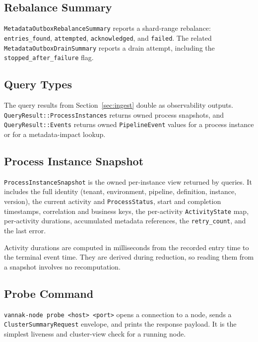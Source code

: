 \subsection{Rebalance Summary}

\texttt{MetadataOutboxRebalanceSummary} reports a shard-range rebalance:
\texttt{entries\_found}, \texttt{attempted}, \texttt{acknowledged}, and
\texttt{failed}. The related \texttt{MetadataOutboxDrainSummary} reports a drain
attempt, including the \texttt{stopped\_after\_failure} flag.

\subsection{Query Types}

The query results from Section~\ref{sec:ingest} double as observability outputs.
\texttt{QueryResult::ProcessInstances} returns owned process snapshots, and
\texttt{QueryResult::Events} returns owned \texttt{PipelineEvent} values for a
process instance or for a metadata-impact lookup.

\subsection{Process Instance Snapshot}

\texttt{ProcessInstanceSnapshot} is the owned per-instance view returned by
queries. It includes the full identity (tenant, environment, pipeline,
definition, instance, version), the current activity and \texttt{ProcessStatus},
start and completion timestamps, correlation and business keys, the per-activity
\texttt{ActivityState} map, per-activity durations, accumulated metadata
references, the \texttt{retry\_count}, and the last error.

\begin{vnote}
Activity durations are computed in milliseconds from the recorded entry time to
the terminal event time. They are derived during reduction, so reading them from
a snapshot involves no recomputation.
\end{vnote}

\subsection{Probe Command}

\texttt{vannak-node probe <host> <port>} opens a connection to a node, sends a
\texttt{ClusterSummaryRequest} envelope, and prints the response payload. It is
the simplest liveness and cluster-view check for a running node.

